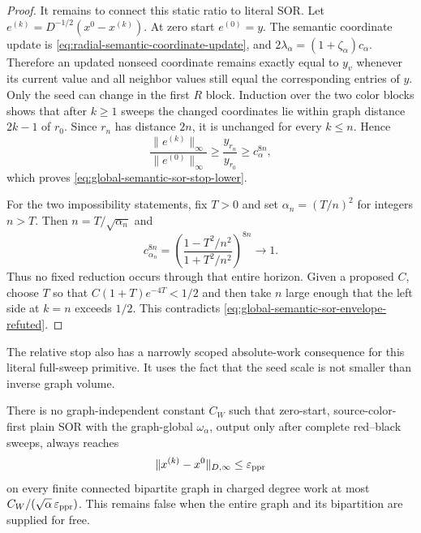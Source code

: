 \begin{proof}
It remains to connect this static ratio to literal SOR.  Let
$e^{(k)}=D^{-1/2}(x^0-x^{(k)})$.  At zero start $e^{(0)}=y$.  The semantic
coordinate update is
\eqref{eq:radial-semantic-coordinate-update}, and
$2\lambda_\alpha=(1+\zeta_\alpha)c_\alpha$.  Therefore an updated nonseed
coordinate remains exactly equal to $y_v$ whenever its current value and all
neighbor values still equal the corresponding entries of $y$.  Only the seed
can change in the first $R$ block.  Induction over the two color blocks shows
that after $k\geq1$ sweeps the changed coordinates lie within graph distance
$2k-1$ of $r_0$.  Since $r_n$ has distance $2n$, it is unchanged for every
$k\leq n$.  Hence
\begin{equation*}
 \frac{\|e^{(k)}\|_\infty}{\|e^{(0)}\|_\infty}
 \geq\frac{y_{r_n}}{y_{r_0}}
 \geq c_\alpha^{8n},
\end{equation*}
which proves \eqref{eq:global-semantic-sor-stop-lower}.

For the two impossibility statements, fix $T>0$ and set
$\alpha_n=(T/n)^2$ for integers $n>T$.  Then
$n=T/\sqrt{\alpha_n}$ and
\begin{equation*}
 c_{\alpha_n}^{8n}
 =\left(\frac{1-T^2/n^2}{1+T^2/n^2}\right)^{8n}
 \longrightarrow1.
\end{equation*}
Thus no fixed reduction occurs through that entire horizon.  Given a proposed
$C$, choose $T$ so that $C(1+T)e^{-4T}<1/2$ and then take $n$ large enough
that the left side at $k=n$ exceeds $1/2$.  This contradicts
\eqref{eq:global-semantic-sor-envelope-refuted}.
\end{proof}

The relative stop also has a narrowly scoped absolute-work consequence for
this literal full-sweep primitive.  It uses the fact that the seed scale is
not smaller than inverse graph volume.

\begin{corollary}
\label{cor:global-semantic-sor-work-stop}
There is no graph-independent constant $C_W$ such that zero-start,
source-color-first plain SOR with the graph-global $\omega_\alpha$, output
only after complete red--black sweeps, always reaches
\begin{equation*}
 \|x^{(k)}-x^0\|_{D,\infty}\leq\varepsilon_{\rm ppr}
\end{equation*}
on every finite connected bipartite graph in charged degree work at most
$C_W/(\sqrt\alpha\,\varepsilon_{\rm ppr})$.  This remains false when the
entire graph and its bipartition are supplied for free.
\end{corollary}

